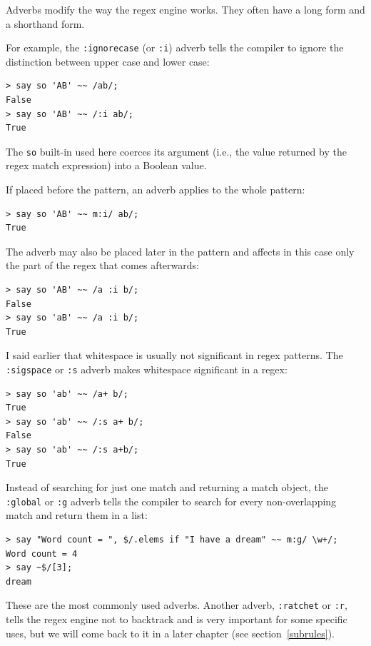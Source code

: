 Adverbs modify the way the regex engine works. They often have a 
long form and a shorthand form.

For example, the \verb':ignorecase' (or \verb':i') adverb 
tells the compiler to ignore the distinction between upper 
case and lower case: 

\begin{verbatim}
> say so 'AB' ~~ /ab/;
False
> say so 'AB' ~~ /:i ab/;
True
\end{verbatim}
%

The \verb'so' built-in used here coerces its argument (i.e., 
the value returned by the regex match expression) into 
a Boolean value. 

If placed before the pattern, an adverb applies to the 
whole pattern:

\begin{verbatim}
> say so 'AB' ~~ m:i/ ab/;
True
\end{verbatim}
%

The adverb may also be placed later in the pattern and affects 
in this case only the part of the regex that comes afterwards:

\begin{verbatim}
> say so 'AB' ~~ /a :i b/;
False
> say so 'aB' ~~ /a :i b/;
True
\end{verbatim}
%

I said earlier that whitespace is usually not significant 
in regex patterns. The \verb':sigspace' or \verb':s' adverb 
makes whitespace significant in a regex:

\begin{verbatim}
> say so 'ab' ~~ /a+ b/;
True
> say so 'ab' ~~ /:s a+ b/;
False
> say so 'ab' ~~ /:s a+b/;
True
\end{verbatim}
%

Instead of searching for just one match and returning a 
match object, the \verb':global' or \verb':g' adverb tells
the compiler to search for every non-overlapping match 
and return them in a list:

\begin{verbatim}
> say "Word count = ", $/.elems if "I have a dream" ~~ m:g/ \w+/;
Word count = 4
> say ~$/[3];
dream
\end{verbatim}
%

These are the most commonly used adverbs. Another adverb, 
\verb':ratchet' or \verb':r', tells the regex engine 
not to backtrack and is very important for some specific 
uses, but we will come back to it in a later chapter (see 
section~\ref{subrules}).

